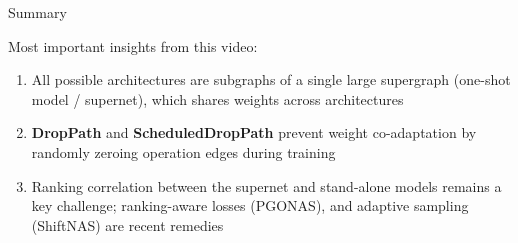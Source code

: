 \documentclass[main]{subfiles}
\begin{document}
\begin{frame}{Summary} 

Most important insights from this video:

\begin{enumerate}
    \item All possible architectures are subgraphs of a single large supergraph (one-shot model / supernet), which shares weights across architectures
    \item \textbf{DropPath} and \textbf{ScheduledDropPath} prevent weight co-adaptation by randomly zeroing operation edges during training
    \item Ranking correlation between the supernet and stand-alone models remains a key challenge; ranking-aware losses (PGONAS), and adaptive sampling (ShiftNAS) are recent remedies

\end{enumerate}


\end{frame}
\end{document}
